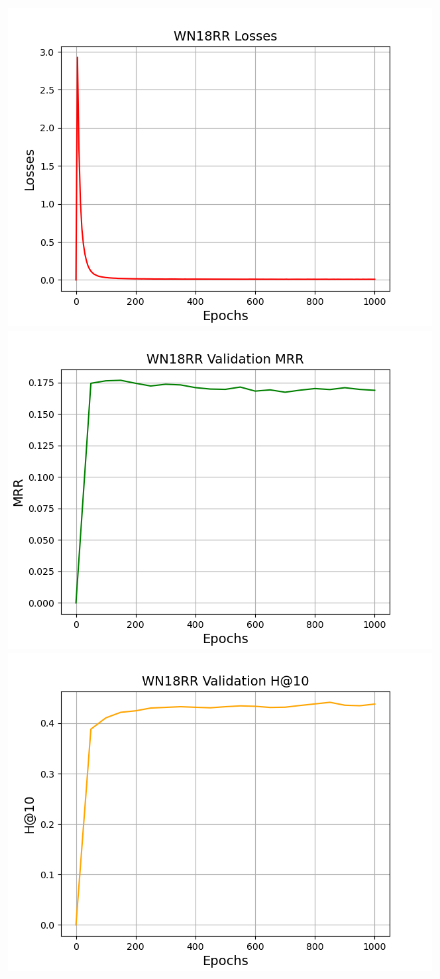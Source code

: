 \begin{figure}
    \centering
    \begin{minipage}{.3\textwidth}
      \centering
      \includegraphics[width=0.9\linewidth]{figures/results/WN18RR/Pretraining/TransE/pretrain_wn18rr_losses.png}
    \end{minipage}%
    \begin{minipage}{.3\textwidth}
      \centering
      \includegraphics[width=0.9\linewidth]{figures/results/WN18RR/Pretraining/TransE/pretrain_wn18rr_mrr.png}
    \end{minipage}
    \begin{minipage}{.3\textwidth}
      \centering
      \includegraphics[width=0.9\linewidth]{figures/results/WN18RR/Pretraining/TransE/pretrain_wn18rr_hit10.png}

\end{minipage}
\end{figure}

